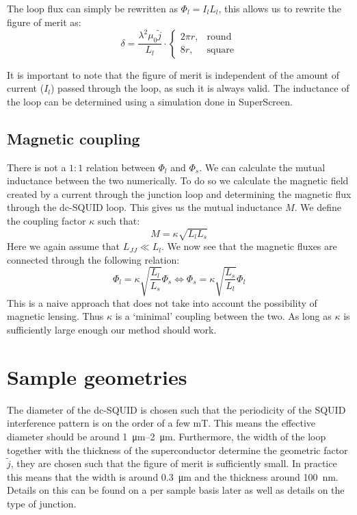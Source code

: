 The loop flux can simply be rewritten as $\Phi_l = I_lL_l$, this allows us to rewrite the figure of merit as:
\begin{equation}
	\delta = \frac{\lambda^2\mu_0\tilde{j}}{L_l} \cdot \begin{cases}
		2\pi r, &\text{round} \\
		8r, &\text{square}
	\end{cases}
	\label{eqn:figure-of-merit}
\end{equation}

It is important to note that the figure of merit is independent of the amount of current ($I_l$) passed through the loop, as such it is always valid. The inductance of the loop can be determined using a simulation done in SuperScreen\cite{bishop-vanhornSuperScreenOpensourcePackage2022}.

\subsection{Magnetic coupling}
\label{sec:magnetic-coupling}
There is not a $1:1$ relation between $\Phi_l$ and $\Phi_s$. We can calculate the mutual inductance between the two numerically. To do so we calculate the magnetic field created by a current through the junction loop and determining the magnetic flux through the dc-SQUID loop. This gives us the mutual inductance $M$. We define the coupling factor $\kappa$ such that:
\begin{equation}
	M = \kappa \sqrt{L_lL_s}
\end{equation}
Here we again assume that $L_{JJ} \ll L_l$. We now see that the magnetic fluxes are connected through the following relation:
\begin{equation}
	\Phi_l = \kappa \sqrt{\frac{L_l}{L_s}}\Phi_s \Leftrightarrow \Phi_s = \kappa \sqrt{\frac{L_s}{L_l}}\Phi_l
\end{equation}
This is a naive approach that does not take into account the possibility of magnetic lensing\cite{prigozhin3DSimulationSuperconducting2018}. Thus $\kappa$ is a `minimal' coupling between the two. As long as $\kappa$ is sufficiently large enough our method should work.

\section{Sample geometries}
The diameter of the dc-SQUID is chosen such that the periodicity of the SQUID interference pattern is on the order of a few \unit{\milli\tesla}. This means the effective diameter should be around \qtyrange{1}{2}{\micro\meter}. Furthermore, the width of the loop together with the thickness of the superconductor determine the geometric factor $\tilde{j}$, they are chosen such that the figure of merit is sufficiently small. In practice this means that the width is around \qty{0.3}{\micro\meter} and the thickness around \qty{100}{\nano\meter}. Details on this can be found on a per sample basis later as well as details on the type of junction.

